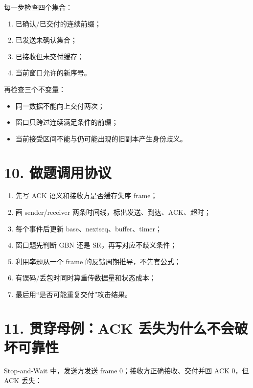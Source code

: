 \documentclass[UTF8,fontset=none,11pt,a4paper]{ctexart}
\providecommand{\tightlist}{\setlength{\itemsep}{0pt}\setlength{\parskip}{0pt}}
\begin{document}
每一步检查四个集合：

\begin{enumerate}
\def\labelenumi{\arabic{enumi}.}
\tightlist
\item
  已确认/已交付的连续前缀；
\item
  已发送未确认集合；
\item
  已接收但未交付缓存；
\item
  当前窗口允许的新序号。
\end{enumerate}

再检查三个不变量：

\begin{itemize}
\tightlist
\item
  同一数据不能向上交付两次；
\item
  窗口只跨过连续满足条件的前缀；
\item
  当前接受区间不能与仍可能出现的旧副本产生身份歧义。
\end{itemize}

\section{10.
做题调用协议}\label{10-ux505aux9898ux8c03ux7528ux534fux8bae}

\begin{enumerate}
\def\labelenumi{\arabic{enumi}.}
\tightlist
\item
  先写 ACK 语义和接收方是否缓存失序 frame；
\item
  画 sender/receiver 两条时间线，标出发送、到达、ACK、超时；
\item
  每个事件后更新 base、nextseq、buffer、timer；
\item
  窗口题先判断 GBN 还是 SR，再写对应不歧义条件；
\item
  利用率题从一个 frame 的反馈周期推导，不先套公式；
\item
  有误码/丢包时同时算重传数据量和状态成本；
\item
  最后用``是否可能重复交付''攻击结果。
\end{enumerate}

\section{11. 贯穿母例：ACK
丢失为什么不会破坏可靠性}\label{11-ux8d2fux7a7fux6bcdux4f8back-ux4e22ux5931ux4e3aux4ec0ux4e48ux4e0dux4f1aux7834ux574fux53efux9760ux6027}

Stop-and-Wait 中，发送方发送 frame 0；接收方正确接收、交付并回 ACK 0，但
ACK 丢失：
\end{document}
